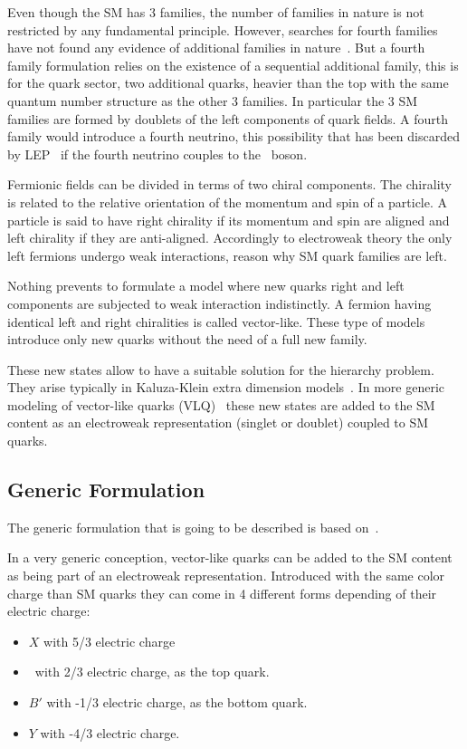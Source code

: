 Even though the SM has 3 families, the number of families in nature is not restricted by any fundamental principle. However, searches for fourth families have not found any evidence of additional families in nature~\cite{Eberhardt:2012gv}. But a fourth family formulation relies on the existence of a sequential additional family, this is for the quark sector, two additional quarks, heavier than the top with the same quantum number structure as the other 3 families. In particular the 3 SM families are formed by doublets of the left components of quark fields. A fourth family would introduce a fourth neutrino, this possibility that has been discarded by LEP~\cite{ALEPH:2005ab} if the fourth neutrino couples to the \Z~boson.

Fermionic fields can be divided in terms of two chiral components. The chirality is related to the relative orientation of the momentum and spin of a particle. A particle is said to have right chirality if its momentum and spin are aligned and left chirality if they are anti-aligned.  Accordingly to electroweak theory the only left fermions undergo weak interactions, reason why SM quark families are left. 

Nothing prevents to formulate a model where new quarks right and left components are subjected to weak interaction indistinctly. A fermion having identical left and right chiralities is called vector-like. These type of models introduce only new quarks without the need of a full new family.

These new states allow to have a suitable solution for the hierarchy problem. They arise typically in Kaluza-Klein extra dimension models~\cite{Kaluza:1921tu, Contino:2006qr, Matsedonskyi:2012ym, Dissertori:2010ug}. In more generic modeling of vector-like quarks (VLQ)~\cite{Aguilar-Saavedra:2013qpa, Buchkremer:2013bha} these new states are added to the SM content as an electroweak representation (singlet or doublet) coupled to SM quarks.

\subsection{Generic Formulation}
\label{sec:form}

The generic formulation that is going to be described is based on~\cite{Buchkremer:2013bha, Cacciapaglia:2011fx}.

In a very generic conception, vector-like quarks can be added to the SM content as being part of an electroweak representation. Introduced with the same color charge than SM quarks they can come in 4 different forms depending of their electric charge:
\begin{itemize}
\item $X$ with 5/3 electric charge
\item \Tp~with 2/3 electric charge, as the top quark.
\item $B'$ with -1/3 electric charge, as the bottom quark.
\item $Y$ with -4/3 electric charge.
\end{itemize}

